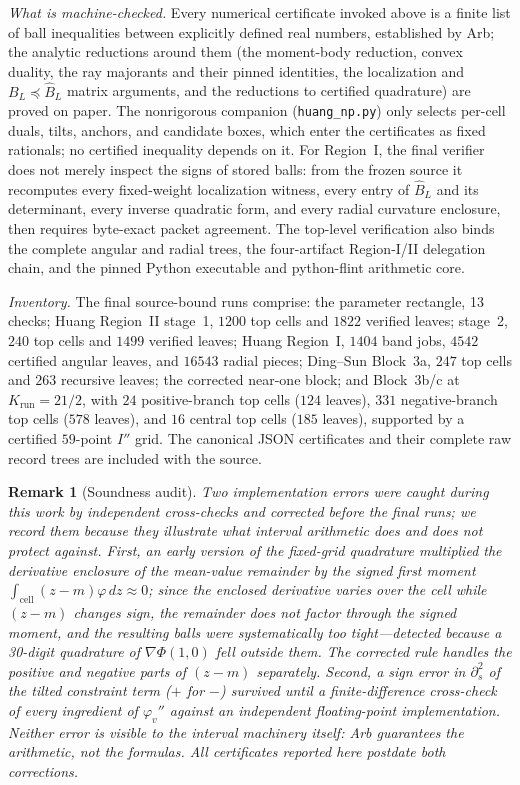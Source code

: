 \documentclass[11pt]{article}
\newtheorem{remark}[theorem]{Remark}
\begin{document}
\emph{What is machine-checked.} Every numerical certificate invoked above is
a finite list of ball inequalities between explicitly defined real numbers,
established by Arb; the analytic reductions around them (the moment-body reduction, convex
duality, the ray majorants and their pinned identities, the localization and
$B_L\preceq\widehat B_L$ matrix arguments, and the reductions to certified quadrature) are proved on
paper. The nonrigorous companion (\texttt{huang\_np.py}) only selects
per-cell duals, tilts, anchors, and candidate boxes, which enter the
certificates as fixed rationals; no certified inequality depends on it.
For Region~I, the final verifier does not merely inspect the signs of stored
balls: from the frozen source it recomputes every fixed-weight localization
witness, every entry of $\widehat B_L$ and its determinant, every inverse quadratic
form, and every radial curvature enclosure, then requires byte-exact packet
agreement.  The top-level verification also binds the complete angular and
radial trees, the four-artifact Region-I/II delegation chain, and the pinned
Python executable and python-flint arithmetic core.

\emph{Inventory.} The final source-bound runs comprise: the parameter rectangle, 13 checks; Huang Region~II stage~1, $1200$ top cells and $1822$ verified leaves; stage~2, $240$ top cells and $1499$ verified leaves; Huang Region~I, $1404$ band jobs, $4542$ certified angular leaves, and $16543$ radial pieces; Ding--Sun Block~3a, $247$ top cells and $263$ recursive leaves; the corrected near-one block; and Block~3b/c at $K_{\mathrm{run}}=21/2$, with $24$ positive-branch top cells ($124$ leaves), $331$ negative-branch top cells ($578$ leaves), and $16$ central top cells ($185$ leaves), supported by a certified $59$-point $I''$ grid. The canonical JSON certificates and their complete raw record trees are included with the source.

\begin{remark}[Soundness audit]
Two implementation errors were caught during this work by independent
cross-checks and corrected before the final runs; we record them because
they illustrate what interval arithmetic does and does not protect against.
First, an early version of the fixed-grid quadrature multiplied the
derivative enclosure of the mean-value remainder by the \emph{signed} first
moment $\int_{\text{cell}}(z-m)\varphi\,dz\approx 0$; since the enclosed
derivative varies over the cell while $(z-m)$ changes sign, the remainder
does not factor through the signed moment, and the resulting balls were
systematically too tight---detected because a 30-digit quadrature of
$\nabla\Phi(1,0)$ fell outside them. The corrected rule handles the
positive and negative parts of $(z-m)$ separately. Second, a sign error in
$\partial_s^2$ of the tilted constraint term ($+$ for $-$) survived until a
finite-difference cross-check of every ingredient of $\varphi_v''$ against
an independent floating-point implementation. Neither error is visible to
the interval machinery itself: Arb guarantees the arithmetic, not the
formulas. All certificates reported here postdate both corrections.
\end{remark}
\end{document}
